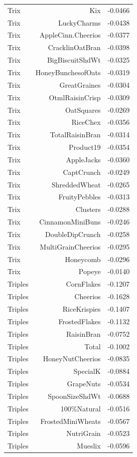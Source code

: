 \begin{longtable}{@{}lrr@{}}
Trix & Kix & -0.0466 \\
Trix & LuckyCharms & -0.0438 \\
Trix & AppleCinn.Cheerios & -0.0377 \\
Trix & CracklinOatBran & -0.0398 \\
Trix & BigBiscuitShdWt & -0.0325 \\
Trix & HoneyBunchesofOats & -0.0319 \\
Trix & GreatGraines & -0.0304 \\
Trix & OtmlRaisinCrisp & -0.0309 \\
Trix & OatSquares & -0.0269 \\
Trix & RiceChex & -0.0356 \\
Trix & TotalRaisinBran & -0.0314 \\
Trix & Product19 & -0.0354 \\
Trix & AppleJacks & -0.0360 \\
Trix & CaptCrunch & -0.0249 \\
Trix & ShreddedWheat & -0.0265 \\
Trix & FruityPebbles & -0.0313 \\
Trix & Clusters & -0.0288 \\
Trix & CinnamonMiniBuns & -0.0246 \\
Trix & DoubleDipCrunch & -0.0258 \\
Trix & MultiGrainCheerios & -0.0295 \\
Trix & Honeycomb & -0.0296 \\
Trix & Popeye & -0.0140 \\
Triples & CornFlakes & -0.1207 \\
Triples & Cheerios & -0.1628 \\
Triples & RiceKrispies & -0.1407 \\
Triples & FrostedFlakes & -0.1132 \\
Triples & RaisinBran & -0.0752 \\
Triples & Total & -0.1002 \\
Triples & HoneyNutCheerios & -0.0835 \\
Triples & SpecialK & -0.0884 \\
Triples & GrapeNuts & -0.0534 \\
Triples & SpoonSizeShdWt & -0.0688 \\
Triples & 100\%Natural & -0.0516 \\
Triples & FrostedMiniWheats & -0.0567 \\
Triples & NutriGrain & -0.0523 \\
Triples & Mueslix & -0.0596 \\

\end{longtable}
